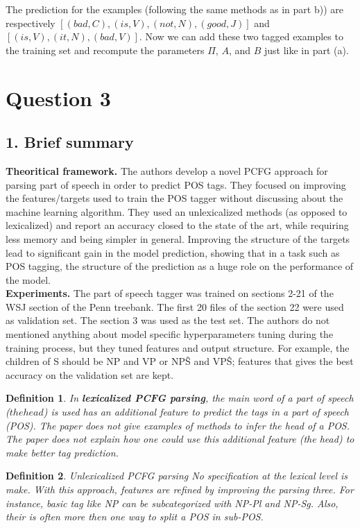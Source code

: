 \documentclass[10pt]{article}
\newtheorem{definition}{Definition}
\begin{document}
The prediction for the examples (following the same methods as in part b)) are respectively $[(bad, C),  (is, V), (not, N), (good, J)]$ and $[(is, V), (it, N), (bad, V)]$. Now we can add these two tagged examples to the training set and recompute the parameters $\Pi$, $A$, and $B$ just like in part (a).


\section*{Question 3}
\subsection*{1. Brief summary}
\textbf{Theoritical framework.} The authors develop a novel PCFG approach for parsing part of speech in order to predict POS tags. They focused on improving the features/targets used to train the POS tagger without discussing about the machine learning algorithm. They used an unlexicalized methods (as opposed to lexicalized) and report an accuracy closed to the state of the art, while requiring less memory and being simpler in general. Improving the structure of the targets lead to significant gain in the model prediction, showing that in a task such as POS tagging, the structure of the prediction as a huge role on the performance of the model. \\

\textbf{Experiments.} The part of speech tagger was trained on sections 2-21 of the WSJ section of the Penn treebank. The first 20 files of the section 22 were used as validation set. The section 3 was used as the test set. The authors do not mentioned anything about model specific hyperparameters tuning during the training process, but they tuned features and output structure. For example, the children of S should be NP and VP or NP\^S and VP\^S; features that gives the best accuracy on the validation set are kept. 

\begin{definition} 
In \textbf{lexicalized PCFG parsing}, the main word of a part of speech ($the head$) is used has an additional feature to predict the tags in a part of speech (POS). The paper does not give examples of methods to infer the head of a POS. The paper does not explain how one could use this additional feature (the head) to make better tag prediction.
\end{definition}

\begin{definition} Unlexicalized PCFG parsing
No specification at the lexical level is make. With this approach, features are refined by improving the parsing three. For instance, basic tag like NP can be subcategorized with NP-Pl and NP-Sg. Also, their is often more then one way to split a POS in sub-POS.

\end{definition}
\end{document}
